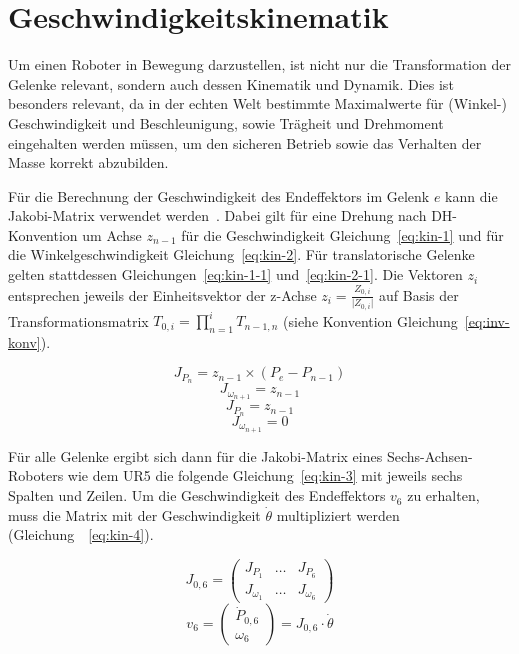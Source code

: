 \section{Geschwindigkeitskinematik}\label{sec:geschwindigkeitskinematik}

Um einen Roboter in Bewegung darzustellen, ist nicht nur die Transformation der Gelenke relevant, sondern auch dessen Kinematik und Dynamik.
Dies ist besonders relevant, da in der echten Welt bestimmte Maximalwerte für (Winkel-) Geschwindigkeit und Beschleunigung, sowie Trägheit und Drehmoment eingehalten werden müssen, um den sicheren Betrieb sowie das Verhalten der Masse korrekt abzubilden.

Für die Berechnung der Geschwindigkeit des Endeffektors im Gelenk $e$ kann die Jakobi-Matrix verwendet werden~\cite[105ff]{sicilianoRobotics2009}.
Dabei gilt für eine Drehung nach DH-Konvention um Achse $z_{n-1}$ für die Geschwindigkeit Gleichung~\ref{eq:kin-1} und für die Winkelgeschwindigkeit Gleichung~\ref{eq:kin-2}.
Für translatorische Gelenke gelten stattdessen Gleichungen~\ref{eq:kin-1-1} und~\ref{eq:kin-2-1}.
Die Vektoren $z_{i}$ entsprechen jeweils der Einheitsvektor der z-Achse $z_{i} = \frac{Z_{0,i}}{\lvert Z_{0,i} \rvert}$ auf Basis der Transformationsmatrix $T_{0,i} = \prod_{n=1}^{i}T_{n-1,n}$ (siehe Konvention Gleichung~\ref{eq:inv-konv}).

\begin{equation}
    J_{P_{n}} = z_{n-1} \times (P_{e} - P_{n-1}) \label{eq:kin-1}
\end{equation}
\begin{equation}
    J_{\omega_{n+1}} = z_{n-1} \label{eq:kin-2}
\end{equation}
\begin{equation}
    J_{P_{n}} = z_{n-1} \label{eq:kin-1-1}
\end{equation}
\begin{equation}
    J_{\omega_{n+1}} = 0 \label{eq:kin-2-1}
\end{equation}

Für alle Gelenke ergibt sich dann für die Jakobi-Matrix eines Sechs-Achsen-Roboters wie dem UR5 die folgende Gleichung~\ref{eq:kin-3} mit jeweils sechs Spalten und Zeilen.
Um die Geschwindigkeit des Endeffektors $v_6$ zu erhalten, muss die Matrix mit der Geschwindigkeit $\dot{\theta}$ multipliziert werden (Gleichung~~\ref{eq:kin-4}).

\begin{equation}
    J_{0,6}=
    \begin{pmatrix}
        J_{P_1}      & \dots & J_{P_6}      \\
        J_{\omega_1} & \dots & J_{\omega_6}
    \end{pmatrix}\label{eq:kin-3}
\end{equation}
\begin{equation}
    v_6 =
    \begin{pmatrix}
        \dot{P}_{0,6} \\ \omega_6
    \end{pmatrix} =
    J_{0,6}\cdot\dot{\theta}
    \label{eq:kin-4}
\end{equation}